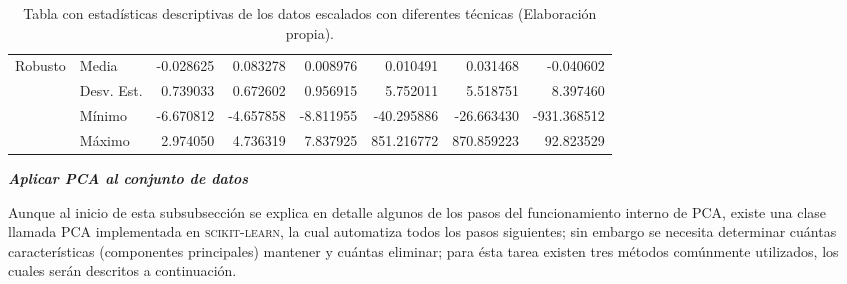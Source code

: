 \begin{landscape}
\begin{table}[p!]
\begin{tabular}{ll|r|r|r|r|r|r|}
\multicolumn{1}{|l|}{\multirow{4}{*}{Robusto}} & Media & -0.028625 & 0.083278 & 0.008976 & 0.010491 & 0.031468 & -0.040602 \\ \cline{2-8} 
\multicolumn{1}{|l|}{}                  & Desv. Est. & 0.739033 & 0.672602 & 0.956915 & 5.752011 & 5.518751 & 8.397460 \\\cline{2-8} 
\multicolumn{1}{|l|}{}                  & M\'{i}nimo & -6.670812 & -4.657858	& -8.811955 & -40.295886 & -26.663430 & -931.368512 \\ \cline{2-8} 
\multicolumn{1}{|l|}{}                  & M\'{a}ximo & 2.974050 & 4.736319 & 7.837925 & 851.216772 & 870.859223 & 92.823529 \\ \hline
\end{tabular}
\caption{Tabla con estad\'{i}sticas descriptivas de los datos escalados con diferentes t\'{e}cnicas (Elaboraci\'{o}n propia).}
\label{table:scalers}
\end{table}
\end{landscape}


\pagestyle{thesis}

\vspace{5mm} %

\textbf{\textit{Aplicar PCA al conjunto de datos}}

\vspace{5mm} %

Aunque al inicio de esta subsubsecci\'{o}n se explica en detalle algunos de los pasos del funcionamiento interno de PCA, existe una clase llamada PCA implementada en \textsc{scikit-learn}, la cual automatiza todos los pasos siguientes; sin embargo se necesita determinar cu\'{a}ntas caracter\'{i}sticas (componentes principales) mantener y cu\'{a}ntas eliminar; para \'{e}sta tarea existen tres m\'{e}todos com\'{u}nmente utilizados, los cuales ser\'{a}n descritos a continuaci\'{o}n.


